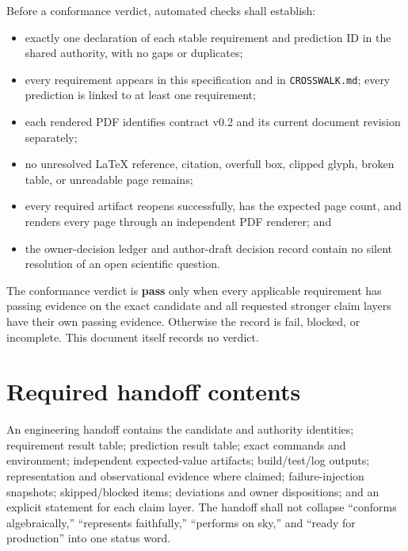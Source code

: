 \documentclass[10pt]{article}
\begin{document}
Before a conformance verdict, automated checks shall establish:

\begin{itemize}
\item exactly one declaration of each stable requirement and prediction ID in
the shared authority, with no gaps or duplicates;
\item every requirement appears in this specification and in
\texttt{CROSSWALK.md}; every prediction is linked to at least one requirement;
\item each rendered PDF identifies contract v0.2 and its current document
revision separately;
\item no unresolved LaTeX reference, citation, overfull box, clipped glyph,
broken table, or unreadable page remains;
\item every required artifact reopens successfully, has the expected page
count, and renders every page through an independent PDF renderer; and
\item the owner-decision ledger and author-draft decision record contain no
silent resolution of an open scientific question.
\end{itemize}

The conformance verdict is \textbf{pass} only when every applicable requirement
has passing evidence on the exact candidate and all requested stronger claim
layers have their own passing evidence. Otherwise the record is fail, blocked,
or incomplete. This document itself records no verdict.

\section{Required handoff contents}

An engineering handoff contains the candidate and authority identities;
requirement result table; prediction result table; exact commands and
environment; independent expected-value artifacts; build/test/log outputs;
representation and observational evidence where claimed; failure-injection
snapshots; skipped/blocked items; deviations and owner dispositions; and an
explicit statement for each claim layer. The handoff shall not collapse
``conforms algebraically,'' ``represents faithfully,'' ``performs on sky,'' and
``ready for production'' into one status word.
\end{document}
